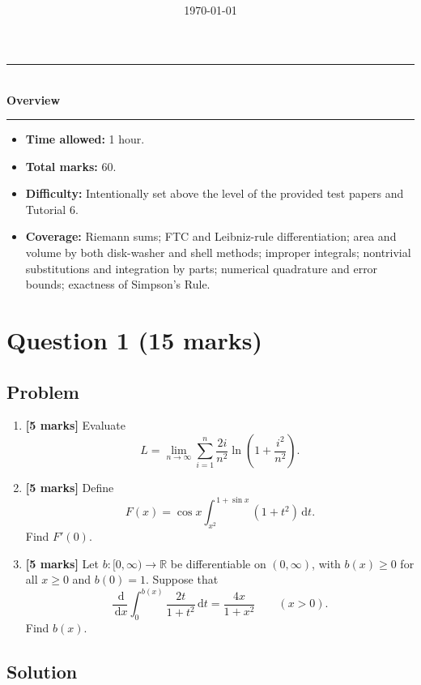 \documentclass[12pt]{article}
\title{
\Huge \CourseCode\ \CourseName \\[0.3em]
\Large \DocType \\[0.3em]
\ExamMeta
}
\date{\today}
\newcommand{\dd}{\,\mathrm{d}}
\newcommand{\R}{\mathbb{R}}
\newenvironment{overview}{
\par\bigskip
\begin{center}
\rule{0.92\linewidth}{0.6pt}\\[-0.2em]
\textbf{Overview}\\[-0.2em]
\rule{0.92\linewidth}{0.6pt}
\end{center}
\vspace{-0.3em}
\begin{itemize}[leftmargin=1.6em, itemsep=0.2em, topsep=0.2em]
}{
\end{itemize}
\par\bigskip
}
\begin{document}
\maketitle
\thispagestyle{plainfirst}
\pagestyle{main}

\begin{overview}
\item \textbf{Time allowed:} 1 hour.
\item \textbf{Total marks:} 60.
\item \textbf{Difficulty:} Intentionally set above the level of the provided test papers and Tutorial 6.
\item \textbf{Coverage:} Riemann sums; FTC and Leibniz-rule differentiation; area and volume by both disk-washer and shell methods; improper integrals; nontrivial substitutions and integration by parts; numerical quadrature and error bounds; exactness of Simpson's Rule.
\end{overview}

\newpage
\tableofcontents
\newpage

\section{Question 1 \hfill (15 marks)}

\subsection{Problem}

\begin{enumerate}[label=(\alph*)]
\item \textbf{[5 marks]} Evaluate
\[
L=\lim_{n\to\infty}\sum_{i=1}^n \frac{2i}{n^2}\ln\!\left(1+\frac{i^2}{n^2}\right).
\]

\item \textbf{[5 marks]} Define
\[
F(x)=\cos x\int_{x^2}^{\,1+\sin x}(1+t^2)\dd t.
\]
Find \(F'(0)\).

\item \textbf{[5 marks]} Let \(b:[0,\infty)\to\R\) be differentiable on \((0,\infty)\), with \(b(x)\ge 0\) for all \(x\ge 0\) and \(b(0)=1\). Suppose that
\[
\frac{\dd}{\dd x}\int_0^{b(x)}\frac{2t}{1+t^2}\dd t=\frac{4x}{1+x^2}
\qquad (x>0).
\]
Find \(b(x)\).
\end{enumerate}

\subsection{Solution}
\end{document}

